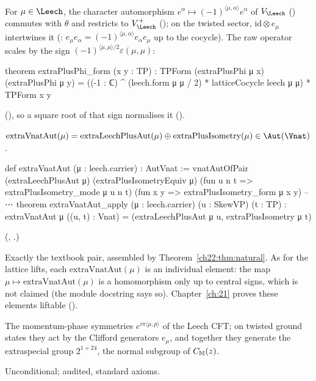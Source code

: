 For $\mu\in\Leech$, the character automorphism $e^\alpha\mapsto(-1)^{\langle\mu,\alpha\rangle}e^\alpha$ of $V_\Leech$
() commutes with $\theta$ and restricts to $V_\Leech^+$ (); on the twisted
sector, $\mathrm{id}\otimes e_\mu$ intertwines it (: $e_\mu e_\alpha=(-1)^{\langle\mu,\alpha\rangle}
e_\alpha e_\mu$ up to the cocycle).  The raw operator scales  by the sign
$(-1)^{\langle\mu,\mu\rangle/2}\varepsilon(\mu,\mu)$:
\begin{leancode}
theorem extraPlusPhi_form (x y : TP) :
    TPForm (extraPlusPhi μ x) (extraPlusPhi μ y)
      = ((-1 : ℂ) ^ (leech.form μ μ / 2) * latticeCocycle leech μ μ) * TPForm x y
\end{leancode}
(), so a square root of that sign normalises it
().

\begin{definition}\label{ch22:def:extra}
$\mathrm{extraVnatAut}(\mu)=\mathrm{extraLeechPlusAut}(\mu)\oplus\mathrm{extraPlusIsometry}(\mu)\in\Aut(\Vnat)$.
\end{definition}
\begin{leancode}
def extraVnatAut (μ : leech.carrier) : AutVnat :=
  vnatAutOfPair (extraLeechPlusAut μ) (extraPlusIsometryEquiv μ)
    (fun u n t => extraPlusIsometry_mode μ u n t) (fun x y => extraPlusIsometry_form μ x y)
-- ⋯
theorem extraVnatAut_apply (μ : leech.carrier) (u : SkewVP) (t : TP) :
    extraVnatAut μ ((u, t) : Vnat) = (extraLeechPlusAut μ u, extraPlusIsometry μ t)
\end{leancode}
(, .)
\begin{dictionary}
Exactly the textbook pair, assembled by Theorem~\ref{ch22:thm:natural}.  As for the lattice lifts, each
$\mathrm{extraVnatAut}(\mu)$ is an individual element: the map $\mu\mapsto\mathrm{extraVnatAut}(\mu)$ is a
homomorphism only up to central signs, which is not claimed (the module docstring says so).
Chapter~\ref{ch:21} proves these elements liftable ().
\end{dictionary}
\begin{physics}
The momentum-phase symmetries $e^{i\pi\langle\mu,p\rangle}$ of the Leech CFT; on twisted ground states they act by the
Clifford generators $e_\mu$, and together they generate the extraspecial group $2^{1+24}$, the normal subgroup of
$C_{\mathbb{M}}(z)$.
\end{physics}
\begin{status}Unconditional; audited, standard axioms.\end{status}

